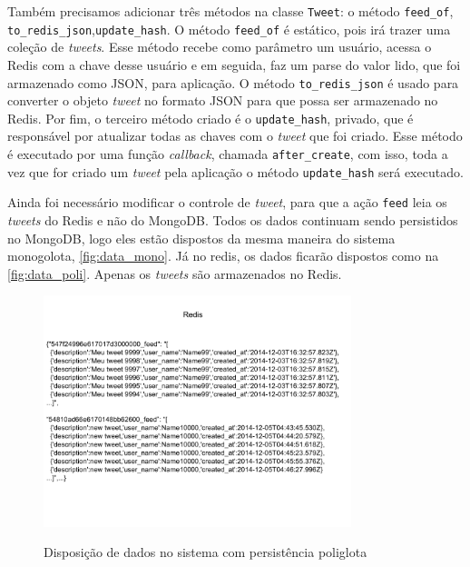 Também precisamos adicionar três métodos na classe \verb|Tweet|: o método \verb|feed_of|, \verb|to_redis_json|,\verb|update_hash|. O método \verb|feed_of| é estático, pois irá trazer uma coleção de \textit{tweets}. Esse método recebe como parâmetro um usuário, acessa o \ac{Redis} com a chave desse usuário e em seguida, faz um parse do valor lido, que foi armazenado como JSON, para aplicação. O método \verb|to_redis_json| é usado para converter o objeto \textit{tweet} no formato JSON para que possa ser armazenado no \ac{Redis}. Por fim, o terceiro método criado é o \verb|update_hash|, privado, que é responsável por atualizar todas as chaves com o \textit{tweet} que foi criado. Esse método é executado por uma função \textit{callback}, chamada \verb|after_create|, com isso, toda a vez que for criado um \textit{tweet} pela aplicação o método \verb|update_hash| será executado.

Ainda foi necessário modificar o controle de \textit{tweet}, para que a ação \verb|feed| leia os \textit{tweets} do \ac{Redis} e não do MongoDB. Todos os dados continuam sendo persistidos no MongoDB, logo eles estão dispostos da mesma maneira do sistema monogolota, \autoref{fig:data_mono}. Já no redis, os dados ficarão dispostos como na \autoref{fig:data_poli}. Apenas os \textit{tweets} são armazenados no \ac{Redis}.
\begin{figure}[H]
    \centering
    \caption{Disposição de dados no sistema com persistência poliglota}
    \includegraphics[width=0.8\textwidth]{./04-figuras/data_poli.png}
    \label{fig:data_poli}
\end{figure}





